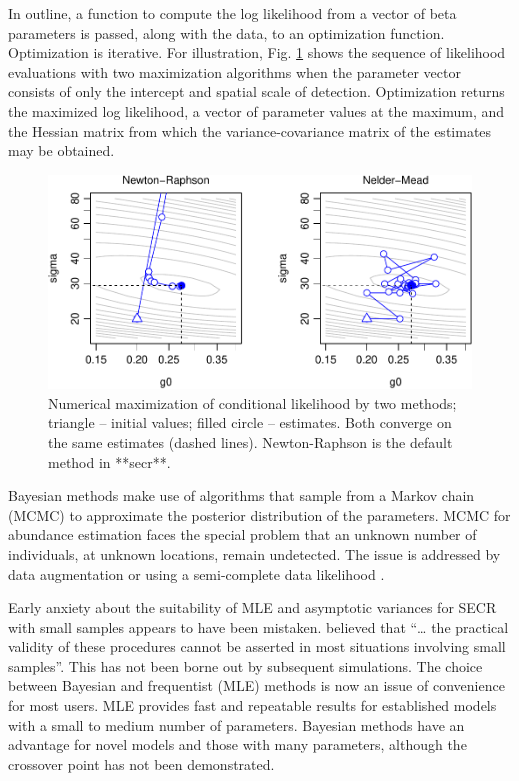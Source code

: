 \documentclass[
]{book}
\begin{document}
In outline, a function to compute the log likelihood from a vector of beta parameters is passed, along with the data, to an optimization function. Optimization is iterative. For illustration, Fig. \ref{fig:MLE} shows the sequence of likelihood evaluations with two maximization algorithms when the parameter vector consists of only the intercept and spatial scale of detection. Optimization returns the maximized log likelihood, a vector of parameter values at the maximum, and the Hessian matrix from which the variance-covariance matrix of the estimates may be obtained.

\begin{figure}
\includegraphics[width=1\linewidth]{SECRbook_files/figure-latex/MLE-1} \caption{Numerical maximization of conditional likelihood by two methods; triangle -- initial values; filled circle -- estimates. Both converge on the same estimates (dashed lines). Newton-Raphson is the default method in **secr**.}\label{fig:MLE}
\end{figure}

Bayesian methods make use of algorithms that sample from a Markov chain (MCMC) to approximate the posterior distribution of the parameters. MCMC for abundance estimation faces the special problem that an unknown number of individuals, at unknown locations, remain undetected. The issue is addressed by data augmentation \citep{ry08} or using a semi-complete data likelihood \citep{Zhang2022}.

Early anxiety about the suitability of MLE and asymptotic variances for SECR with small samples appears to have been mistaken. \citet{Royle2009} believed that ``\ldots{} the practical validity of these procedures cannot be asserted in most situations involving small samples''. This has not been borne out by subsequent simulations. The choice between Bayesian and frequentist (MLE) methods is now an issue of convenience for most users. MLE provides fast and repeatable results for established models with a small to medium number of parameters. Bayesian methods have an advantage for novel models and those with many parameters, although the crossover point has not been demonstrated.
\end{document}
